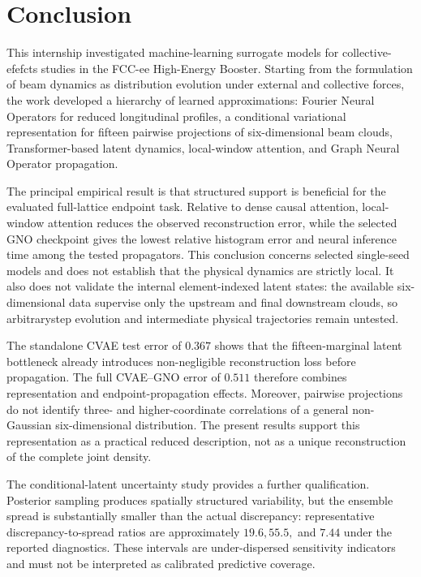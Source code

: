
\chapter{Conclusion}
\label{sec:07_conclusion_conclusion}

This internship investigated machine-learning surrogate models for collective-efefcts studies in the FCC-ee High-Energy Booster. Starting from the formulation of beam dynamics as distribution evolution under external and collective forces, the work developed a hierarchy of learned approximations: Fourier Neural Operators for reduced longitudinal profiles, a conditional variational representation for fifteen pairwise projections of six-dimensional beam clouds, Transformer-based latent dynamics, local-window attention, and Graph Neural Operator propagation.

The principal empirical result is that structured support is beneficial for the evaluated full-lattice endpoint task. Relative to dense causal attention, local-window attention reduces the observed reconstruction error, while the selected GNO checkpoint gives the lowest relative histogram error and neural inference time among the tested propagators. This conclusion concerns selected single-seed models and does not establish that the physical dynamics are strictly local. It also does not validate the internal element-indexed latent states: the available six-dimensional data supervise only the upstream and final downstream clouds, so arbitrarystep evolution and intermediate physical trajectories remain untested.

The standalone CVAE test error of \(0.367\) shows that the fifteen-marginal latent bottleneck already introduces non-negligible reconstruction loss before propagation. The full CVAE–GNO error of \(0.511\) therefore combines representation and endpoint-propagation effects. Moreover, pairwise projections do not identify three- and higher-coordinate correlations of a general non-Gaussian six-dimensional distribution. The present results support this representation as a practical reduced description, not as a unique reconstruction of the complete joint density.

The conditional-latent uncertainty study provides a further qualification. Posterior sampling produces spatially structured variability, but the ensemble spread is substantially smaller than the actual discrepancy: representative discrepancy-to-spread ratios are approximately \(19.6 , 55.5 ,\) and \(7.44\) under the reported diagnostics. These intervals are under-dispersed sensitivity indicators and must not be interpreted as calibrated predictive coverage.

